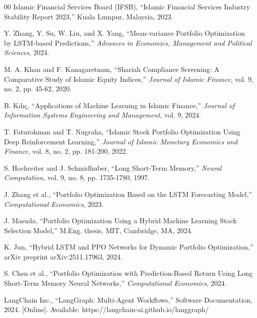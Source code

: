 \documentclass[conference]{IEEEtran}
\begin{document}
\begin{thebibliography}{00}
 Islamic Financial Services Board (IFSB), ``Islamic Financial Services Industry Stability Report 2023,'' Kuala Lumpur, Malaysia, 2023.

 Y. Zhang, Y. Su, W. Liu, and X. Yang, ``Mean-variance Portfolio Optimization by LSTM-based Predictions,'' \emph{Advances in Economics, Management and Political Sciences}, 2024.

 M. A. Khan and F. Kanagaretnam, ``Shariah Compliance Screening: A Comparative Study of Islamic Equity Indices,'' \emph{Journal of Islamic Finance}, vol. 9, no. 2, pp. 45-62, 2020.

 B. Kılıç, ``Applications of Machine Learning in Islamic Finance,'' \emph{Journal of Information Systems Engineering and Management}, vol. 9, 2024.

 T. Faturohman and T. Nugraha, ``Islamic Stock Portfolio Optimization Using Deep Reinforcement Learning,'' \emph{Journal of Islamic Monetary Economics and Finance}, vol. 8, no. 2, pp. 181-200, 2022.

 S. Hochreiter and J. Schmidhuber, ``Long Short-Term Memory,'' \emph{Neural Computation}, vol. 9, no. 8, pp. 1735-1780, 1997.

 J. Zhang et al., ``Portfolio Optimization Based on the LSTM Forecasting Model,'' \emph{Computational Economics}, 2023.

 J. Masuda, ``Portfolio Optimization Using a Hybrid Machine Learning Stock Selection Model,'' M.Eng. thesis, MIT, Cambridge, MA, 2024.

 K. Jun, ``Hybrid LSTM and PPO Networks for Dynamic Portfolio Optimization,'' arXiv preprint arXiv:2511.17963, 2024.

 S. Chen et al., ``Portfolio Optimization with Prediction-Based Return Using Long Short-Term Memory Neural Networks,'' \emph{Computational Economics}, 2024.

 LangChain Inc., ``LangGraph: Multi-Agent Workflows,'' Software Documentation, 2024. [Online]. Available: https://langchain-ai.github.io/langgraph/

\end{thebibliography}

\vspace{12pt}
\end{document}

